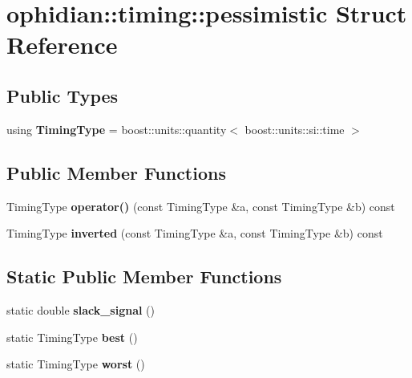 \hypertarget{structophidian_1_1timing_1_1pessimistic}{\section{ophidian\-:\-:timing\-:\-:pessimistic Struct Reference}
\label{structophidian_1_1timing_1_1pessimistic}
}
\subsection*{Public Types}
\begin{DoxyCompactItemize}
\item 
\hypertarget{structophidian_1_1timing_1_1pessimistic_a95ad2952df3309633ca1e171318eb887}{using {\bfseries Timing\-Type} = boost\-::units\-::quantity$<$ boost\-::units\-::si\-::time $>$}\label{structophidian_1_1timing_1_1pessimistic_a95ad2952df3309633ca1e171318eb887}

\end{DoxyCompactItemize}
\subsection*{Public Member Functions}
\begin{DoxyCompactItemize}
\item 
\hypertarget{structophidian_1_1timing_1_1pessimistic_a53c3d6817253a4cb3f3308117aad423c}{Timing\-Type {\bfseries operator()} (const Timing\-Type \&a, const Timing\-Type \&b) const }\label{structophidian_1_1timing_1_1pessimistic_a53c3d6817253a4cb3f3308117aad423c}

\item 
\hypertarget{structophidian_1_1timing_1_1pessimistic_a28a8312055931c8ed20ec85aad528347}{Timing\-Type {\bfseries inverted} (const Timing\-Type \&a, const Timing\-Type \&b) const }\label{structophidian_1_1timing_1_1pessimistic_a28a8312055931c8ed20ec85aad528347}

\end{DoxyCompactItemize}
\subsection*{Static Public Member Functions}
\begin{DoxyCompactItemize}
\item 
\hypertarget{structophidian_1_1timing_1_1pessimistic_a21ee98678ca1bc09d0abffefb195c8ce}{static double {\bfseries slack\-\_\-signal} ()}\label{structophidian_1_1timing_1_1pessimistic_a21ee98678ca1bc09d0abffefb195c8ce}

\item 
\hypertarget{structophidian_1_1timing_1_1pessimistic_a21e5e2cdfad2187b453013e8188bae45}{static Timing\-Type {\bfseries best} ()}\label{structophidian_1_1timing_1_1pessimistic_a21e5e2cdfad2187b453013e8188bae45}

\item 
\hypertarget{structophidian_1_1timing_1_1pessimistic_a42c2dc74241e087337b01f05d67b8693}{static Timing\-Type {\bfseries worst} ()}\label{structophidian_1_1timing_1_1pessimistic_a42c2dc74241e087337b01f05d67b8693}

\end{DoxyCompactItemize}


